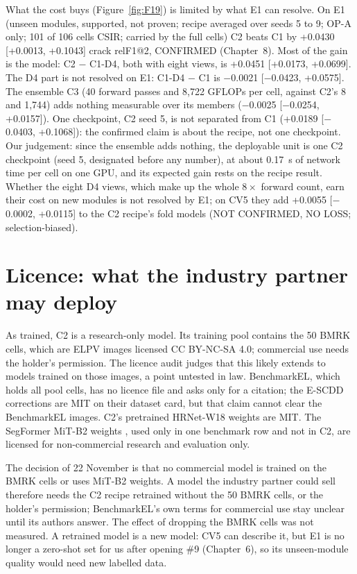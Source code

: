 What the cost buys (Figure~\ref{fig:F19}) is limited by what E1 can resolve. On E1 (unseen modules, supported, not proven; recipe averaged over seeds 5 to 9;
OP-A only; 101 of 106 cells CSIR; carried by the full cells) C2 beats C1 by +0.0430 [+0.0013, +0.1043] crack relF1@2, CONFIRMED
(Chapter~8). Most of the gain is the model: C2 $-$ C1-D4, both with eight views, is +0.0451 [+0.0173, +0.0699]. The D4 part is not
resolved on E1: C1-D4 $-$ C1 is $-$0.0021 [$-$0.0423, +0.0575]. The ensemble C3 (40 forward passes and 8,722 GFLOPs per cell, against
C2's 8 and 1,744) adds nothing measurable over its members ($-$0.0025 [$-$0.0254, +0.0157]). One checkpoint, C2 seed 5, is not
separated from C1 (+0.0189 [$-$0.0403, +0.1068]): the confirmed claim is about the recipe, not one checkpoint. Our judgement: since the
ensemble adds nothing, the deployable unit is one C2 checkpoint (seed 5, designated before any number), at about 0.17~s of network
time per cell on one GPU, and its expected gain rests on the recipe result. Whether the eight D4 views, which make up the whole
$8\times$ forward count, earn their cost on new modules is not resolved by E1; on CV5 they add +0.0055 [$-$0.0002, +0.0115] to the
C2 recipe's fold models (NOT CONFIRMED, NO LOSS; selection-biased).

\section{Licence: what the industry partner may deploy}
\label{sec:deploy-licence}

As trained, C2 is a research-only model. Its training pool contains the 50 BMRK cells, which are ELPV images \citep{deitsch2019elpv}
licensed CC BY-NC-SA 4.0; commercial use needs the holder's permission. The licence audit judges that this likely extends to models
trained on those images, a point untested in law. BenchmarkEL, which holds all pool cells, has no licence file and asks only for a
citation; the E-SCDD corrections are MIT on their dataset card, but that claim cannot clear the BenchmarkEL images. C2's pretrained
HRNet-W18 weights \citep{wang2021hrnet} are MIT. The SegFormer MiT-B2 weights \citep{xie2021segformer}, used only in one benchmark row
and not in C2, are licensed for non-commercial research and evaluation only.

The decision of 22 November is that no commercial model is trained on the BMRK cells or uses MiT-B2 weights. A model the industry partner could
sell therefore needs the C2 recipe retrained without the 50 BMRK cells, or the holder's permission; BenchmarkEL's own terms for
commercial use stay unclear until its authors answer. The effect of dropping the BMRK cells was not measured. A retrained model is
a new model: CV5 can describe it, but E1 is no longer a zero-shot set for us after opening \#9 (Chapter~6), so its unseen-module quality would need new labelled
data.

